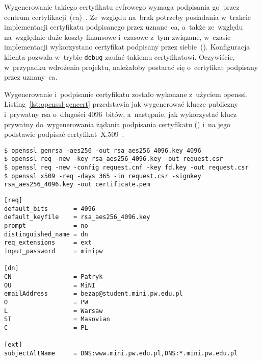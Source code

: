 \documentclass[thesis]{subfiles}
\begin{document}
Wygenerowanie takiego certyfikatu cyfrowego wymaga podpisania go~przez centrum certyfikacji~(\gls{ca})~\cite{wiki:ca}. Ze~względu na~brak potrzeby posiadania w~trakcie implementacji certyfikatu podpisanego przez uznane~\gls{ca}, a~także ze~względu na~względnie duże koszty finansowe i~czasowe z~tym związane, w~czasie implementacji wykorzystano certyfikat podpisany przez siebie~(). Konfiguracja klienta pozwala w~trybie \texttt{debug} zaufać takiemu certyfikatowi. Oczywiście, w~przypadku wdrożenia projektu, należałoby postarać się o~certyfikat podpisany przez uznany~\gls{ca}.

Wygenerowanie i~podpisanie certyfikatu zostało wykonane z~użyciem \gls{openssl}. Listing~\ref{lst:openssl-gencert} przedstawia jak wygenerować klucze publiczny i~prywatny \gls{rsa} o~długości 4096~bitów, a~następnie, jak wykorzystać klucz prywatny do~wygenerowania żądania podpisania certyfikatu () i~na jego podstawie podpisać certyfikat~X.509~\cite{openssl-cookbook,wiki:csr}.\\%

\begin{lstlisting}[numbers=none,caption={Wygenerowanie i~podpisanie certyfikatu X.509},label=lst:openssl-gencert]
$ openssl genrsa -aes256 -out rsa_aes256_4096.key 4096
$ openssl req -new -key rsa_aes256_4096.key -out request.csr
$ openssl req -new -config request.cnf -key fd.key -out request.csr
$ openssl x509 -req -days 365 -in request.csr -signkey rsa_aes256_4096.key -out certificate.pem
\end{lstlisting}

\begin{lstlisting}[numbers=none,caption={Plik z~konfiguracją certyfikatu X.509},label=lst:openssl-request-config]
[req]
default_bits       = 4096
default_keyfile    = rsa_aes256_4096.key
prompt             = no
distinguished_name = dn
req_extensions     = ext
input_password     = minipw

[dn]
CN                 = Patryk
OU                 = MiNI
emailAddress       = bezap@student.mini.pw.edu.pl
O                  = PW
L                  = Warsaw
ST                 = Masovian
C                  = PL

[ext]
subjectAltName     = DNS:www.mini.pw.edu.pl,DNS:*.mini.pw.edu.pl
\end{lstlisting}
\end{document}
